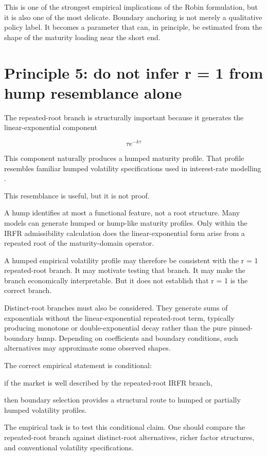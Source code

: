 \documentclass[11pt,oneside]{book}
\begin{document}
This is one of the strongest empirical implications of the Robin
formulation, but it is also one of the most delicate. Boundary anchoring
is not merely a qualitative policy label. It becomes a parameter that
can, in principle, be estimated from the shape of the maturity loading
near the short end.

\section{Principle 5: do not infer r = 1 from hump resemblance
alone}\label{principle-5-do-not-infer-r-1-from-hump-resemblance-alone}

The repeated-root branch is structurally important because it generates
the linear-exponential component

\[
\tau e^{-k\tau}
\]

This component naturally produces a humped maturity profile. That
profile resembles familiar humped volatility specifications used in
interest-rate modelling \cite{MercurioMoraleda2000,MercurioMoraleda2001,MoraledaVorst1997,RitchkenChuang1999}.

This resemblance is useful, but it is not proof.

A hump identifies at most a functional feature, not a root structure.
Many models can generate humped or hump-like maturity profiles. Only
within the IRFR admissibility calculation does the linear-exponential
form arise from a repeated root of the maturity-domain operator.

A humped empirical volatility profile may therefore be consistent with
the r = 1 repeated-root branch. It may motivate testing that branch. It
may make the branch economically interpretable. But it does not
establish that r = 1 is the correct branch.

Distinct-root branches must also be considered. They generate sums of
exponentials without the linear-exponential repeated-root term,
typically producing monotone or double-exponential decay rather than the
pure pinned-boundary hump. Depending on coefficients and boundary
conditions, such alternatives may approximate some observed shapes.

The correct empirical statement is conditional:

if the market is well described by the repeated-root IRFR branch,

then boundary selection provides a structural route to humped or
partially humped volatility profiles.

The empirical task is to test this conditional claim. One should compare
the repeated-root branch against distinct-root alternatives, richer
factor structures, and conventional volatility specifications.
\end{document}
